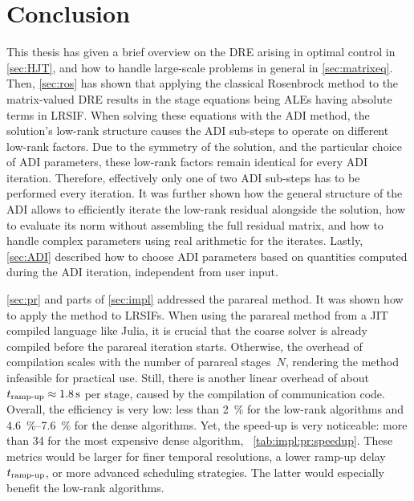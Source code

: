 \chapter{Conclusion}
\label{sec:conclusion}


This thesis has given a brief overview on the \ac{DRE} arising in optimal control in \autoref{sec:HJT},
and how to handle large-scale problems in general in \autoref{sec:matrixeq}.
Then, \autoref{sec:ros} has shown that
applying the classical Rosenbrock method to the matrix-valued \ac{DRE}
results in the stage equations being \acp{ALE}
having absolute terms in \ac{LRSIF}.
When solving these equations with the \ac{ADI} method,
the solution's low-rank structure causes the \ac{ADI} sub-steps to operate on different low-rank factors.
Due to the symmetry of the solution,
and the particular choice of \ac{ADI} parameters,
these low-rank factors remain identical for every \ac{ADI} iteration.
Therefore, effectively only one of two \ac{ADI} sub-steps has to be performed every iteration.
It was further shown how the general structure of the \ac{ADI} allows to efficiently iterate the low-rank residual alongside the solution,
how to evaluate its norm without assembling the full residual matrix,
and how to handle complex parameters using real arithmetic for the iterates.
Lastly, \autoref{sec:ADI} described how to choose \ac{ADI} parameters based on quantities computed during the \ac{ADI} iteration,
\ie independent from user input.

\autoref{sec:pr} and parts of \autoref{sec:impl} addressed the parareal method.
It was shown how to apply the method to \acp{LRSIF}.
When using the parareal method from a \ac{JIT} compiled language like Julia,
it is crucial that the coarse solver is already compiled before the parareal iteration starts.
Otherwise, the overhead of compilation scales with the number of parareal stages~$N$,
rendering the method infeasible for practical use.
Still, there is another linear overhead of about $t_\text{ramp-up} \approx \SI{1.8}{\second}$ per stage,
caused by the compilation of communication code.
Overall, the efficiency is very low:
less than \SI{2}{\percent} for the low-rank algorithms and
\SIrange{4.6}{7.6}{\percent} for the dense algorithms.
Yet, the speed-up is very noticeable:
\eg more than \num{34} for the most expensive dense algorithm,
\cf~\autoref{tab:impl:pr:speedup}.
These metrics would be larger for finer temporal resolutions,
a lower ramp-up delay~$t_\text{ramp-up}$,
or more advanced scheduling strategies.
The latter would especially benefit the low-rank algorithms.

